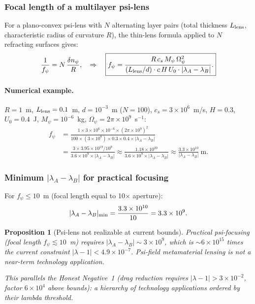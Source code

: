 \documentclass[11pt,twocolumn]{article}
\newcommand{\lam}{\lambda}
\newcommand{\Opsi}{\Omega_\psi}
\newcommand{\Mpsi}{M_\psi}
\newtheorem{proposition}{Proposition}
\begin{document}
\subsubsection{Focal length of a multilayer psi-lens}

For a plano-convex psi-lens with $N$ alternating layer pairs
(total thickness $L_{\rm lens}$, characteristic radius of curvature
$R$), the thin-lens formula applied to $N$ refracting surfaces gives:
\begin{equation}
\frac{1}{f_\psi} = N\,\frac{\delta n_\psi}{R},
\quad\Rightarrow\quad
\boxed{
f_\psi = \frac{R\,c_s\,\Mpsi\,\Opsi^2}
{(L_{\rm lens}/d)\cdot c\,H\,U_0\cdot|\lam_A - \lam_B|}.
}
\label{eq:focal_length}
\end{equation}

\paragraph{Numerical example.}
$R = 1$~m, $L_{\rm lens} = 0.1$~m, $d = 10^{-3}$~m ($N = 100$),
$c_s = 3\times10^6$~m/s, $H = 0.3$, $U_0 = 0.4$~J,
$\Mpsi = 10^{-6}$~kg, $\Opsi = 2\pi\times10^9$~s$^{-1}$:
\begin{align}
f_\psi &= \frac{1\times3\times10^6\times10^{-6}\times(2\pi\times10^9)^2}
{100\times(3\times10^8)\times0.3\times0.4\times|\lam_A-\lam_B|}
\nonumber\\
&= \frac{3\times3.95\times10^{19}/10^9}{3.6\times10^9\times|\lam_A-\lam_B|}
\approx \frac{1.18\times10^{20}}{3.6\times10^9\times|\lam_A-\lam_B|}
\approx \frac{3.3\times10^{10}}{|\lam_A-\lam_B|}~\text{m}.
\label{eq:f_numeric}
\end{align}

\subsubsection{Minimum $|\lam_A - \lam_B|$ for practical focusing}

For $f_\psi \leq 10$~m (focal length equal to 10$\times$ aperture):
\begin{equation}
|\lam_A - \lam_B|_{\rm min} = \frac{3.3\times10^{10}}{10} = 3.3\times10^9.
\label{eq:delta_lambda_min}
\end{equation}

\begin{proposition}[Psi-lens not realizable at current bounds]
\label{prop:psi_lens}
Practical psi-focusing (focal length $f_\psi \lesssim 10$~m) requires
$|\lam_A - \lam_B| \sim 3\times10^9$, which is $\sim 6\times10^{15}$
times the current constraint $|\lam-1| < 4.9\times10^{-7}$. Psi-field
metamaterial lensing is not a near-term technology application.

This parallels the Honest Negative~1 (drag reduction requires
$|\lam-1| > 3\times10^{-2}$, factor $6\times10^4$ above bounds):
a hierarchy of technology applications ordered by their lambda
threshold.
\end{proposition}
\end{document}
